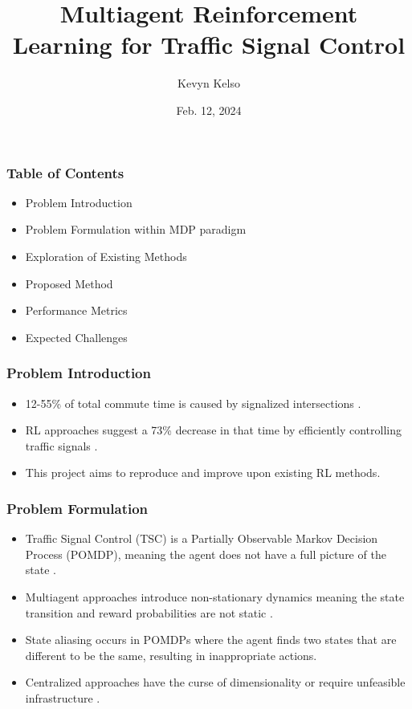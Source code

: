 \documentclass[compress,12pt]{beamer}
\title{Multiagent Reinforcement Learning for Traffic Signal Control}
\date{Feb. 12, 2024}
\author{Kevyn Kelso}
\institute{University of Colorado at Colorado Springs}
\begin{document}
\frame[plain]{\titlepage}


\begin{frame}[bg=arguelles.png]
      \frametitle{Table of Contents}
      \begin{itemize}
      \item Problem Introduction
      \item Problem Formulation within MDP paradigm
      \item Exploration of Existing Methods
      \item Proposed Method
      \item Performance Metrics
      \item Expected Challenges
      \end{itemize}
\end{frame}

\begin{frame}[bg=arguelles.png]
      \frametitle{Problem Introduction}
      \begin{itemize}
      \item 12-55\% of total commute time is caused by signalized intersections \cite{ault2021reinforcement}.
      \item RL approaches suggest a 73\% decrease in that time by efficiently controlling traffic signals \cite{ault2021reinforcement}.
      \item This project aims to reproduce and improve upon existing RL methods.
      \end{itemize}
\end{frame}



\begin{frame}[bg=arguelles.png]
      \frametitle{Problem Formulation}
      \begin{itemize}
      \item Traffic Signal Control (TSC) is a Partially Observable Markov Decision Process (POMDP), meaning the agent does not have a full picture of the state\cite{Almeida2022MultiagentRL} \cite{DBLP:journals/corr/abs-2004-04778} \cite{choi1999environment}.
      \item Multiagent approaches introduce non-stationary dynamics meaning the state transition and reward probabilities are not static\cite{choi1999environment} \cite{10.3389/frai.2022.805823}.
      \item State aliasing occurs in POMDPs where the agent finds two states that are different to be the same, resulting in inappropriate actions. 
      \item Centralized approaches have the curse of dimensionality or require unfeasible infrastructure\cite{DBLP:journals/corr/abs-2004-04778} \cite{ault2021reinforcement}.
      \end{itemize}
\end{frame}
\end{document}
